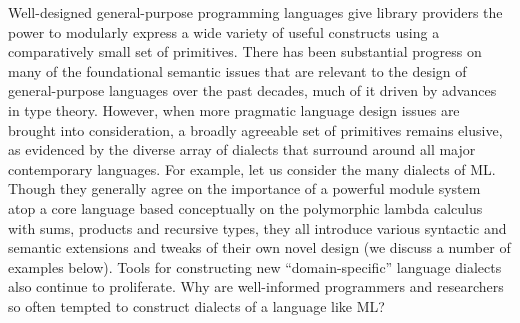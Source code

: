 Well-designed general-purpose programming languages give library providers the power to  modularly express a wide variety of useful constructs using a comparatively small set of primitives. %
There has been substantial progress on many of the foundational semantic issues that are relevant to the design of general-purpose languages over the past  decades, much of it driven by advances in type theory. However, when more pragmatic language design issues are brought into consideration, a broadly agreeable set of primitives remains elusive, as evidenced by the diverse array of dialects that surround around all major con\-temporary languages. 
For example, let us consider the many dialects of ML. Though they generally agree on the importance of a powerful module system atop a core language based conceptually on the   polymorphic lambda calculus with sums, products and recursive types, they all introduce various syntactic and semantic extensions and tweaks of their own novel design (we discuss a number of examples below). Tools for  constructing new ``domain-specific'' language dialects also continue to proliferate. %
Why are well-informed programmers and researchers so often tempted to construct  dialects of a language like ML? 

